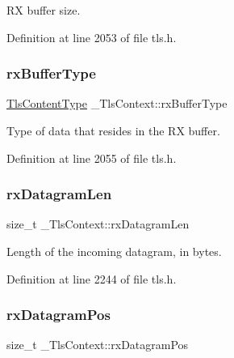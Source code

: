 RX buffer size. 



Definition at line 2053 of file tls.\+h.

\mbox{\label{struct__TlsContext_a93d1f18a3a97e9909cec2e78e8769946}} 
\subsubsection{\texorpdfstring{rx\+Buffer\+Type}{rxBufferType}}
{\footnotesize\ttfamily \hyperlink{tls_8h_a6fad1efb9f011dc3f76039976bef896c}{Tls\+Content\+Type} \+\_\+\+Tls\+Context\+::rx\+Buffer\+Type}



Type of data that resides in the RX buffer. 



Definition at line 2055 of file tls.\+h.

\mbox{\label{struct__TlsContext_a43f02da6c03900e788621df80ae9e0a3}} 
\subsubsection{\texorpdfstring{rx\+Datagram\+Len}{rxDatagramLen}}
{\footnotesize\ttfamily size\+\_\+t \+\_\+\+Tls\+Context\+::rx\+Datagram\+Len}



Length of the incoming datagram, in bytes. 



Definition at line 2244 of file tls.\+h.

\mbox{\label{struct__TlsContext_a0b9ae5ea6b410db3af8440f4d57c76e7}} 
\subsubsection{\texorpdfstring{rx\+Datagram\+Pos}{rxDatagramPos}}
{\footnotesize\ttfamily size\+\_\+t \+\_\+\+Tls\+Context\+::rx\+Datagram\+Pos}



